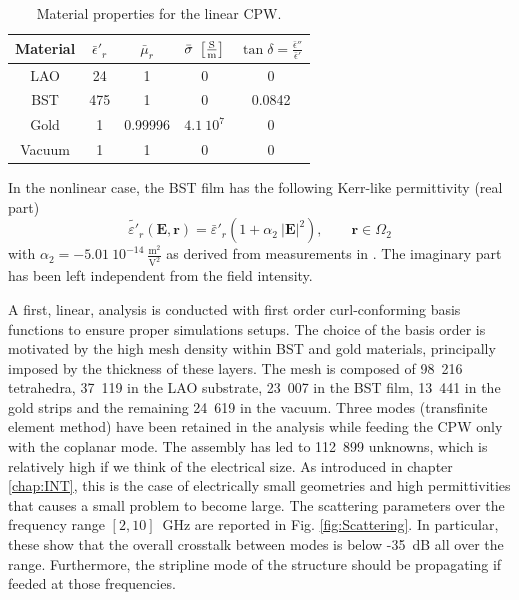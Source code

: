 \begin{table}[h!]
\begin{center}
\begin{tabular}{|c|c|c|c|c|} \hline
Material & ${\bar{\epsilon}'}_r$ & $\bar{\mu}_r$ & $\bar{\sigma}~\left[\frac{\mathrm{S}}{\mathrm{m}}\right]$ & $\tan \delta = \frac{\bar{\epsilon}''}{\bar{\epsilon}'}$ \\ \hline \hline
LAO & 24 & 1 & 0 & 0 \\ \hline
BST & 475 & 1 & 0 & 0.0842 \\ \hline
Gold & 1 & 0.99996 & $4.1~10^7$ & 0 \\ \hline
Vacuum & 1 & 1 & 0 & 0 \\ \hline
\end{tabular}
\end{center}
\caption{Material properties for the linear CPW.}
\label{tab:CPWmat}
\end{table} 

In the nonlinear case, the BST film has the following Kerr-like permittivity (real part)
\begin{equation}
\tilde{{\varepsilon}'}_r(\mathbf{E}, \mathbf{r}) = {\bar{\varepsilon}'}_r \left( 1 + 
\alpha_2 \ |\mathbf{E}|^2 \right), \qquad \mathbf{r} \in \Omega_2
\end{equation}
\noindent with $\alpha_2 = - 5.01~10^{-14}~\frac{\mathrm{m}^2}{\mathrm{V}^2}$ as derived from measurements in \cite{mateu2006measurements}. The imaginary part has been left independent from the field intensity.

A first, linear, analysis is conducted with first order curl-conforming basis functions to ensure proper simulations setups. The choice of the basis order is motivated by the high mesh density within BST and gold materials, principally imposed by the thickness of these layers. The mesh is composed of 98~216 tetrahedra, 37~119 in the LAO substrate, 23~007 in the BST film, 13~441 in the gold strips and the remaining 24~619 in the vacuum. Three modes (transfinite element method) have been retained in the analysis while feeding the CPW only with the coplanar mode. The assembly has led to 112~899 unknowns, which is relatively high if we think of the electrical size. As introduced in chapter \ref{chap:INT}, this is the case of electrically small geometries and high permittivities that causes a small problem to become large. The scattering parameters  over the frequency range $[2,10]$~GHz are reported in Fig. \ref{fig:Scattering}. In particular, these show that the overall crosstalk between modes is below -35~dB all over the range. Furthermore, the stripline mode of the structure should be propagating if feeded at those frequencies.
%

